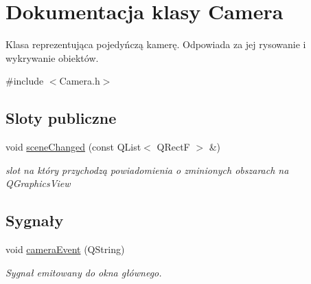 \hypertarget{class_camera}{\section{Dokumentacja klasy Camera}
\label{class_camera}
}


Klasa reprezentująca pojedyńczą kamerę. Odpowiada za jej rysowanie i wykrywanie obiektów.  




{\ttfamily \#include $<$Camera.\-h$>$}

\subsection*{Sloty publiczne}
\begin{DoxyCompactItemize}
\item 
void \hyperlink{class_camera_a71280fa7f0b78ec5b0134361feea23e7}{scene\-Changed} (const Q\-List$<$ Q\-Rect\-F $>$ \&)
\begin{DoxyCompactList}\small\item\em slot na który przychodzą powiadomienia o zminionych obszarach na Q\-Graphics\-View \end{DoxyCompactList}\end{DoxyCompactItemize}
\subsection*{Sygnały}
\begin{DoxyCompactItemize}
\item 
void \hyperlink{class_camera_a5af40cfa217ffb9c6a2fc4d3c931a9cb}{camera\-Event} (Q\-String)
\begin{DoxyCompactList}\small\item\em Sygnał emitowany do okna głównego. \end{DoxyCompactList}\end{DoxyCompactItemize}
